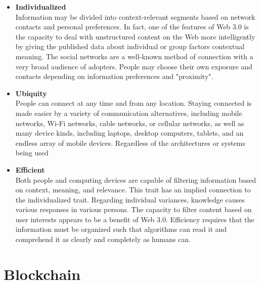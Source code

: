 \vspace{.5cm}

\begin{itemize}

    \item \textbf{Individualized} \\
    Information may be divided into context-relevant segments based on network contacts and personal preferences. In fact, one of the features of Web 3.0 is the capacity to deal with unstructured content on the Web more intelligently by giving the published data about individual or group factors contextual meaning. The social networks are a well-known method of connection with a very broad audience of adopters. People may choose their own exposure and contacts depending on information preferences and "proximity".

\vspace{.5cm}

    \item \textbf{Ubiquity} \\
  People can connect at any time and from any location. Staying connected is made easier by a variety of communication alternatives, including mobile networks, Wi-Fi networks, cable networks, or cellular networks, as well as many device kinds, including laptops, desktop computers, tablets, and an endless array of mobile devices. Regardless of the architectures or systems being used


\vspace{.5cm}


    \item \textbf{Efficient} \\
    Both people and computing devices are capable of filtering information based on context, meaning, and relevance. This trait has an implied connection to the individualized trait. Regarding individual variances, knowledge causes various responses in various persons. The capacity to filter content based on user interests appears to be a benefit of Web 3.0. Efficiency requires that the information must be organized such that algorithms can read it and comprehend it as clearly and completely as humans can.

\end{itemize}
\section{Blockchain}

